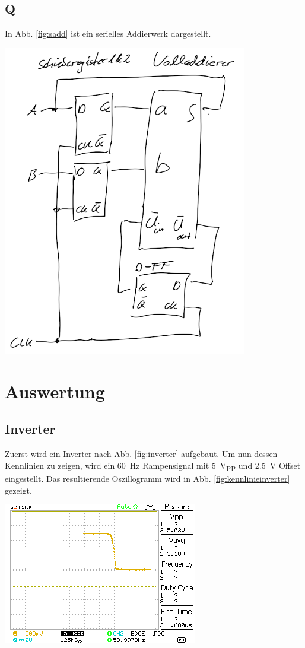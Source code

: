 \documentclass[10pt]{article}
\newenvironment{Figure}
  {\par\medskip\noindent\minipage{\linewidth}}
  {\endminipage\par\medskip}
\begin{document}
\begin{multicols}{2}
	\subsection*{Q}
	In Abb. \ref{fig:sadd} ist ein serielles Addierwerk dargestellt.
	\begin{Figure}
		\centering
		\includegraphics[width=0.8\textwidth]{serielles_addierwerk.png}
		\label{fig:sadd}
	\end{Figure}
	\section{Auswertung}
	\subsection{Inverter}
	Zuerst wird ein Inverter nach Abb. \ref{fig:inverter} aufgebaut. Um nun dessen Kennlinien zu zeigen, wird ein \SI{60}{Hz} Rampensignal mit \SI{5}{V_{PP}} und \SI{2.5}{V} Offset eingestellt. Das resultierende Oszillogramm wird in Abb. \ref{fig:kennlinieinverter} gezeigt.
	\begin{Figure}
		\centering\includegraphics{../data/DS0003.png}
		\label{fig:kennlinieinverter}
	\end{Figure}

\end{multicols}
\end{document}
